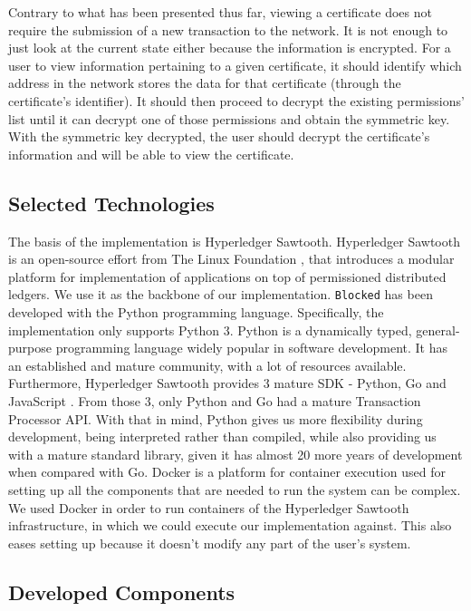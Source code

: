 Contrary to what has been presented thus far, viewing a certificate does not require the submission of a new transaction to the network. It is not enough to just look at the current state either because the information is encrypted. For a user to view information pertaining to a given certificate, it should identify which address in the network stores the data for that certificate (through the certificate's identifier). It should then proceed to decrypt the existing permissions' list until it can decrypt one of those permissions and obtain the symmetric key. With the symmetric key decrypted, the user should decrypt the certificate's information and will be able to view the certificate.

\subsection{Selected Technologies}
\label{sec:implementation-technology}

The basis of the implementation is Hyperledger Sawtooth. Hyperledger Sawtooth is an open-source effort from The Linux Foundation \cite{linuxfoundation}, that introduces a modular platform for implementation of applications on top of permissioned distributed ledgers. We use it as the backbone of our implementation. \texttt{Blocked} has been developed with the Python \cite{python} programming language. Specifically, the implementation only supports Python 3. Python is a dynamically typed, general-purpose programming language widely popular in software development. It has an established and mature community, with a lot of resources available. Furthermore, Hyperledger Sawtooth provides 3 mature SDK - Python, Go \cite{golang} and JavaScript \cite{nodejs}. From those 3, only Python and Go had a mature Transaction Processor API. With that in mind, Python gives us more flexibility during development, being interpreted rather than compiled, while also providing us with a mature standard library, given it has almost 20 more years of development when compared with Go. Docker is a platform for container execution used for setting up all the components that are needed to run the system can be complex. We used Docker in order to run containers of the Hyperledger Sawtooth infrastructure, in which we could execute our implementation against. This also eases setting up because it doesn't modify any part of the user's system.

\subsection{Developed Components}
\label{sec:implementation-core}

